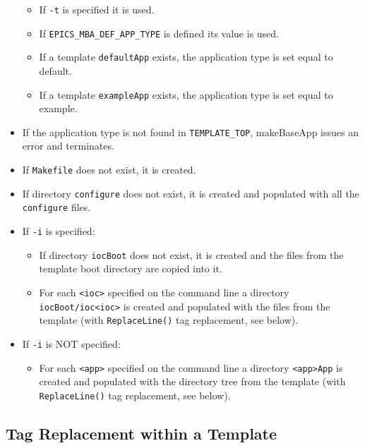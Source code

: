 \begin{itemize}
\begin{itemize}
\item If \verb|-t| is specified it is used.

\item If \verb|EPICS_MBA_DEF_APP_TYPE| is defined its value is used.

\item If a template \verb|defaultApp| exists, the application type is set equal to default.

\item If a template \verb|exampleApp| exists, the application type is set equal to example.
\end{itemize}

\item If the application type is not found in \verb|TEMPLATE_TOP|, makeBaseApp issues an error and terminates.

\item If \verb|Makefile| does not exist, it is created.

\item If directory \verb|configure| does not exist, it is created and populated with all the \verb|configure| files.

\item If \verb|-i| is specified:

\begin{itemize}
\item If directory \verb|iocBoot| does not exist, it is created and the files from the template boot directory are copied 
into it.

\item For each \verb|<ioc>| specified on the command line a directory \verb|iocBoot/ioc<ioc>| is created and populated with the files from the template (with \verb|ReplaceLine()| tag replacement, see below).
\end{itemize}

\item If \verb|-i| is NOT specified:

\begin{itemize}
\item For each \verb|<app>| specified on the command line a directory \verb|<app>App| is created and populated with the directory tree from the template (with \verb|ReplaceLine()| tag replacement, see below).
\end{itemize}
\end{itemize}

\subsection{Tag Replacement within a Template}

